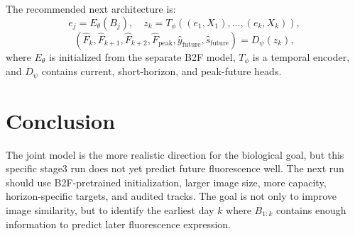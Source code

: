 \documentclass[11pt]{article}
\begin{document}
The recommended next architecture is:
\begin{equation}
e_j = E_{\theta}(B_j), \quad
z_k = T_{\phi}\left((e_1,X_1), \ldots, (e_k,X_k)\right),
\end{equation}
\begin{equation}
(\hat{F}_k,\hat{F}_{k+1},\hat{F}_{k+2},\hat{F}_{\mathrm{peak}},\hat{y}_{\mathrm{future}},\hat{s}_{\mathrm{future}})
= D_{\psi}(z_k),
\end{equation}
where $E_\theta$ is initialized from the separate B2F model, $T_\phi$ is a temporal encoder, and $D_\psi$ contains current, short-horizon, and peak-future heads.

\section{Conclusion}

The joint model is the more realistic direction for the biological goal, but this specific stage3 run does not yet predict future fluorescence well. The next run should use B2F-pretrained initialization, larger image size, more capacity, horizon-specific targets, and audited tracks. The goal is not only to improve image similarity, but to identify the earliest day $k$ where $B_{1:k}$ contains enough information to predict later fluorescence expression.
\end{document}

